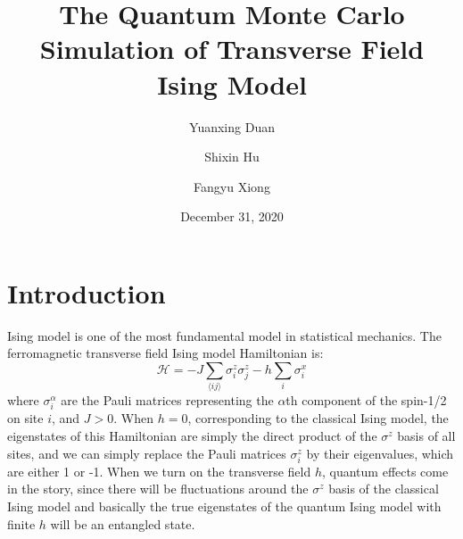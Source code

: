 \documentclass{article}
\title{The Quantum Monte Carlo Simulation of Transverse Field Ising Model}
\author{Yuanxing Duan}
\author{Shixin Hu}
\author{Fangyu Xiong}
\affil{School of Physics, Peking University}
\date{December 31, 2020}
\theoremstyle{plain} \newtheorem{thm}{Theorem}[section]
\theoremstyle{definition} \newtheorem{df}{Definition}[section]
\theoremstyle{definition} \newtheorem{eg}{Example}
\theoremstyle{remark} \newtheorem*{rmk}{Remark}
\begin{document}
\maketitle


\section{Introduction}
Ising model is one of the most fundamental model in statistical mechanics. The ferromagnetic transverse field Ising model Hamiltonian is:
\begin{equation}
	\mathcal{H}=-J\sum_{\langle ij\rangle}\sigma^z_i\sigma^z_j-h\sum_i\sigma_i^x
\end{equation}
where $\sigma_i^\alpha$ are the Pauli matrices representing the $\alpha$th component of the spin-1/2 on site $i$, and $J>0$. When $h=0$, corresponding to the classical Ising model, the eigenstates of this Hamiltonian are simply the direct product of the $\sigma^z$ basis of all sites, and we can simply replace the Pauli matrices $\sigma_i^z$ by their eigenvalues, which are either 1 or -1. When we turn on the transverse field $h$, quantum effects come in the story, since there will be fluctuations around the $\sigma^z$ basis of the classical Ising model and basically the true eigenstates of the quantum Ising model with finite $h$ will be an entangled state. 
\end{document}
